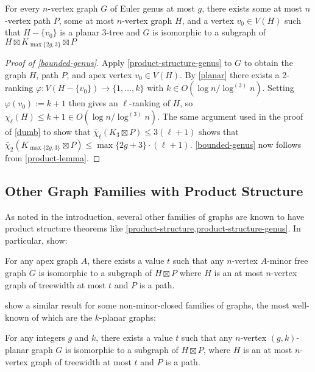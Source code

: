 \documentclass[kpfonts]{patmorin}
\newcommand{\lrn}{\chi_{\ell}}
\newcommand{\dtcn}{\bar{\chi}_2}
\newcommand{\dlcn}{\bar{\chi}_\ell}
\theoremstyle{named}
\begin{document}
\begin{thm} \label{product-structure-genus}
    For every $n$-vertex graph $G$ of Euler genus at most $g$, there exists some at most $n$-vertex path $P$, some at most $n$-vertex graph $H$, and a vertex $v_0\in V(H)$ such that $H-\{v_0\}$ is a planar 3-tree and $G$ is isomorphic to a subgraph of $H\boxtimes K_{\max\{2g,3\}}\boxtimes P$
\end{thm}

\begin{proof}[Proof of \cref{bounded-genus}]
    Apply \cref{product-structure-genus} to $G$ to obtain the graph $H$, path $P$, and apex vertex $v_0\in V(H)$.  By \cref{planar} there exists a 2-ranking $\varphi:V(H-\{v_0\})\to \{1,\ldots,k\}$ with $k\in O(\log n/\log^{(3)} n)$. Setting $\varphi(v_0):=k+1$ then gives an $\ell$-ranking of $H$, so $\lrn(H)\le k+1\in O(\log n/\log^{(3)} n)$.  The same argument used in the proof of \cref{dumb} to show that $\dlcn(K_3\boxtimes P)\le 3(\ell+1)$ shows that $\dtcn(K_{\max\{2g,3\}}\boxtimes P)\le \max\{2g+3\}\cdot(\ell+1)$.  \cref{bounded-genus} now follows from \cref{product-lemma}.
\end{proof}

\subsection{Other Graph Families with Product Structure}

As noted in the introduction, several other families of graphs are known to have product structure theorems like \cref{product-structure,product-structure-genus}.  In particular, \citet{dujmovic.joret.ea:planar} show:

\begin{thm}\label{apex-minor-free}
    For any apex graph $A$, there exists a value $t$ such that any $n$-vertex $A$-minor free graph $G$ is isomorphic to a subgraph of $H\boxtimes P$ where $H$ is an at most $n$-vertex graph of treewidth at most $t$ and $P$ is a path.
\end{thm}

\citet{dujmovic.morin.ea:structure} show a similar result for some non-minor-closed families of graphs, the most well-known of which are the $k$-planar graphs:

\begin{thm}\label{gk-planar}
    For any integers $g$ and $k$, there exists a value $t$ such that any $n$-vertex $(g,k)$-planar graph $G$ is isomorphic to a subgraph of $H\boxtimes P$, where $H$ is an at most $n$-vertex graph of treewidth at most $t$ and $P$ is a path.
\end{thm}
\end{document}
